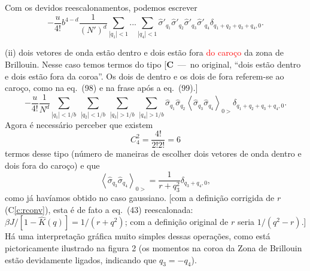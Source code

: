 \documentclass[12pt,a4paper]{article}
\newcommand{\sh}{\widehat{\sigma}}
\newcommand{\Kh}{\widehat{K}}
\newcommand{\corr}[1]{\textcolor{red}{#1}}
\newcounter{corr}
\newcommand{\nota}[2]{\refstepcounter{corr}\label{#1}%
  {\color{red}\small[\textbf{C\thecorr}~---~#2]}}
\begin{document}
Com os devidos reescalonamentos, podemos escrever
\begin{equation}
-\frac{u}{4!}b^{4-d}\frac{1}{\left(N'\right)^d}\sum_{|q_1|<1}...\sum_{|q_4|<1}\sh'_{q_1}\sh'_{q_2}\sh'_{q_3}\sh'_{q_4}\delta_{q_1+q_2+q_3+q_4,0}.
\end{equation}

(ii) dois vetores de onda estão dentro e dois estão fora \corr{do caroço} da zona
de Brillouin. Nesse caso temos termos do tipo
\nota{c:coroa}{no original, ``dois estão dentro e dois estão fora da coroa''. Os dois de
dentro e os dois de fora referem-se ao caroço, como na eq.~(98) e na frase após a eq.~(99).}
\begin{equation}
-\frac{u}{4!}\frac{1}{N^d}\sum_{|q_1|<1/b}\ \sum_{|q_2|<1/b}\ \sum_{|q_3|>1/b}\ \sum_{|q_4|>1/b}\sh_{q_1}\sh_{q_2}\left\langle\sh_{q_3}\sh_{q_4}\right\rangle_{0>}\delta_{q_1+q_2+q_3+q_4,0}.
\end{equation}
Agora é necessário perceber que existem
\begin{equation}
C_4^2=\frac{4!}{2!2!}=6
\end{equation}
termos desse tipo (número de maneiras de escolher dois vetores de onda
dentro e dois fora do caroço) e que
\begin{equation}
\left\langle\sh_{q_3}\sh_{q_4}\right\rangle_{0>}=\frac{1}{r+q_3^2}\delta_{q_3+q_4,0},
\end{equation}
como já havíamos obtido no caso gaussiano.
{\color{red}\small[com a definição corrigida de $r$ (C\ref{c:rconv}), esta é de fato a eq.~(43)
reescalonada: $\beta J/[1-\Kh(q)]=1/(r+q^2)$; com a definição original de $r$ seria $1/(q^2-r)$.]}
Há uma interpretação gráfica
muito simples dessas operações, como está pictoricamente ilustrado na figura
2 (os momentos na coroa da Zona de Brillouin estão devidamente ligados,
indicando que $q_3=-q_4$).
\end{document}
